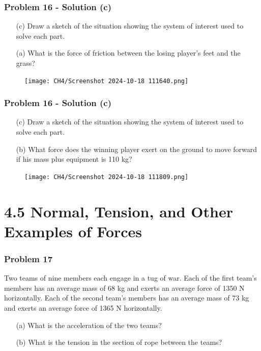 \documentclass{beamer}
\begin{document}
\begin{}
\begin{frame}
\frametitle{Problem 16 - Solution (c)}
\begin{itemize}
\item[(c)] Draw a sketch of the situation showing the system of interest used to solve each part.
    \item[(a)] What is the force of friction between the losing player's feet and the grass?
   
\end{itemize}
\begin{figure}
    \centering
    \texttt{[image: CH4/Screenshot 2024-10-18 111640.png]}
\end{figure}
\end{frame}

\begin{frame}
\frametitle{Problem 16 - Solution (c)}
\begin{itemize}
\item[(c)] Draw a sketch of the situation showing the system of interest used to solve each part.
   \item[(b)] What force does the winning player exert on the ground to move forward if his mass plus equipment is 110 kg?
\end{itemize}
\begin{figure}
    \centering
    \texttt{[image: CH4/Screenshot 2024-10-18 111809.png]}
\end{figure}
\end{frame}

\section{4.5 Normal, Tension, and Other Examples of Forces}

\begin{frame}
\frametitle{Problem 17}
Two teams of nine members each engage in a tug of war. Each of the first team's members has an average mass of 68 kg and exerts an average force of 1350 N horizontally. Each of the second team's members has an average mass of 73 kg and exerts an average force of 1365 N horizontally.
\begin{itemize}
    \item[(a)] What is the acceleration of the two teams?
    \item[(b)] What is the tension in the section of rope between the teams?
\end{itemize}
\end{frame}



\end{}
\end{document}
